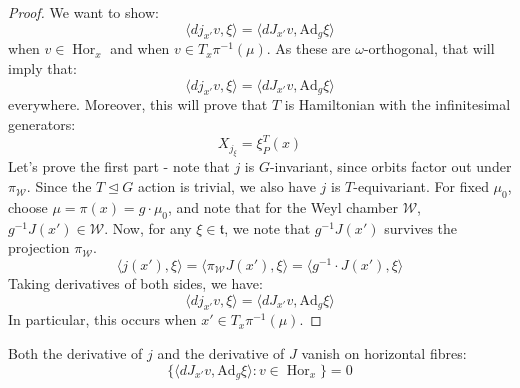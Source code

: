 \begin{proof}
We want to show:
\begin{equation}
\langle dj_{x'} v, \xi \rangle = \langle dJ_{x'} v, \mathrm{Ad}_{g} \xi \rangle
\end{equation}
when $v \in \operatorname{Hor}_{x}$ and when $v \in T_{x} \pi^{-1}(\mu)$. As these are $\omega$-orthogonal, that will imply that:
\begin{equation}
\langle dj_{x'} v, \xi \rangle = \langle dJ_{x'} v, \mathrm{Ad}_{g} \xi \rangle
\end{equation}
everywhere. Moreover, this will prove that $T$ is Hamiltonian with the infinitesimal generators:
\begin{equation}
X_{j_{\xi}} = \xi_{P}^{T}(x)
\end{equation}
Let's prove the first part - note that $j$ is $G$-invariant, since orbits factor out under $\pi_{\mathcal{W}}$. Since the $T \trianglelefteq G$ action is trivial, we also have $j$ is $T$-equivariant. For fixed $\mu_{0}$, choose $\mu = \pi(x) = g \cdot \mu_{0}$, and note that for the Weyl chamber $\mathcal{W}$, $g^{-1} J(x') \in \mathcal{W}$. Now, for any $\xi \in \mathfrak{t}$, we note that $g^{-1} J(x')$ survives the projection $\pi_{\mathcal{W}}$. 
\begin{equation}
\langle j(x'), \xi \rangle = \langle \pi_{\mathcal{W}} J(x'), \xi \rangle = \langle g^{-1} \cdot J(x'), \xi \rangle
\end{equation}
Taking derivatives of both sides, we have:
\begin{equation}
\langle dj_{x'} v, \xi \rangle = \langle dJ_{x'} v, \mathrm{Ad}_{g} \xi \rangle
\end{equation}
In particular, this occurs when $x' \in T_{x} \pi^{-1}(\mu)$.
\end{proof}
\begin{lemma}\label{lem:derivatives-vanish}
Both the derivative of $j$ and the derivative of $J$ vanish on horizontal fibres:
\begin{equation}
\{\langle dJ_{x'} v, \mathrm{Ad}_{g} \xi \rangle: v \in \operatorname{Hor}_{x} \} = 0
\end{equation}
\end{lemma}
